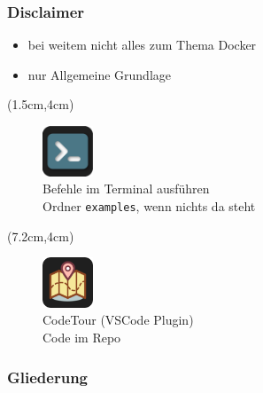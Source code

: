 \documentclass[22pt]{beamer}
\newcommand{\code}[1]{\colorbox{gray!10}{\texttt{#1}}}
\begin{document}
\begin{frame}[t]
    \frametitle{Disclaimer}
    \begin{itemize}
        \item bei weitem nicht alles zum Thema Docker
        \item nur Allgemeine Grundlage
    \end{itemize}

    \begin{textblock*}{4.5cm}(1.5cm,4cm) %
        \begin{figure}
            \includegraphics[width=1.5cm]{Bilder/terminal2.png}
            \captionsetup{justification=centering}
            \caption*{Befehle im Terminal ausführen\\ Ordner \code{examples}, wenn nichts da steht}
        \end{figure}

    \end{textblock*}

    \begin{textblock*}{4.5cm}(7.2cm,4cm) %
        \begin{figure}
            \includegraphics[width=1.5cm]{Bilder/CodeTour.png}
            \centering
            \captionsetup{justification=centering}
            \caption*{CodeTour (VSCode Plugin)\\Code im Repo}
        \end{figure}
    \end{textblock*}

\end{frame}

\begin{frame}[plain]
    \frametitle{Gliederung}
    \tableofcontents
\end{frame}
\end{document}
